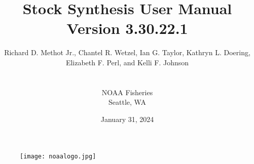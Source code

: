 \documentclass[12pt]{article}
\title{\textcolor[cmyk]{1.00,0.83,0.41,0.36}{Stock Synthesis User Manual\\ Version 3.30.22.1}}
\author{Richard D. Methot Jr., Chantel R. Wetzel, Ian G. Taylor, Kathryn L. Doering,\\Elizabeth F. Perl, and Kelli F. Johnson\\\\\\NOAA Fisheries\\Seattle, WA}
\date{January 31, 2024}
\begin{document}
	\maketitle
	\begin{figure}[ht]
	    \begin{center}
	    	\texttt{[image: noaalogo.jpg]}
	    \end{center}
		\label{fig:logo}
	\end{figure}

	\thispagestyle{empty}
	\newpage
	\normalfont %
	\normalsize %

		
	\tableofcontents
	\thispagestyle{empty}
	\cleardoublepage
	\setcounter{secnumdepth}{0}
	\newpage
	\raggedright
	\renewcommand{\headrulewidth}{0pt} %
	\cleardoublepage
	
	
	
	
	
	
	
	
		
		
		
	
	
	\printnoidxglossary[title=Glossary, toctitle=Glossary] 
	\newpage
	
	
	\newpage	
				
\end{document}
